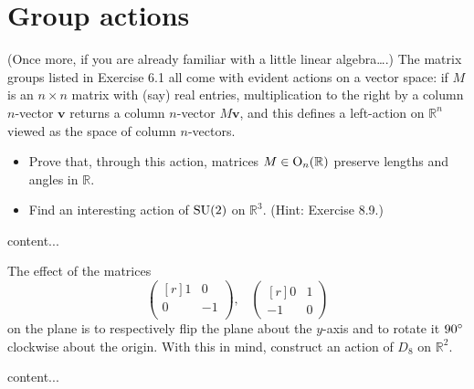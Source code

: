 \section{Group actions}
\extitle

\begin{exercise}
	(Once more, if you are already familiar with a little linear algebra\ldots .) The matrix groups listed in Exercise 6.1 all come with evident actions on a vector space: if $M$ is an $n\times n$ matrix with (say) real entries, multiplication to the right by a column $n$-vector $\mathbf{v}$ returns a column $n$-vector $M\mathbf{v}$, and this defines a left-action on $\mathbb{R}^n$ viewed as the space of column $n$-vectors.
	\begin{itemize}
		\item Prove that, through this action, matrices $M\in \textnormal{O}_n(\mathbb{R})$ preserve lengths and angles in $\mathbb{R}$.
		\item Find an interesting action of $\operatorname{SU}(2)$ on $\mathbb{R}^3$. (Hint: Exercise 8.9.)
	\end{itemize}
\end{exercise}
\begin{solution}
	content...
\end{solution}

\begin{exercise}
	The effect of the matrices
	\[
		\begin{pmatrix*}[r]
			1 & 0\\
			0 & -1\\
		\end{pmatrix*},
		\; \; \;
		\begin{pmatrix*}[r]
			0 & 1 \\
			-1 & 0
		\end{pmatrix*}
	\]
	on the plane is to respectively flip the plane about the $y$-axis and to rotate it $90\degree$ clockwise about the origin. With this in mind, construct an action of $D_8$ on $\mathbb{R}^2$.
\end{exercise}
\begin{solution}
	content...
\end{solution}

